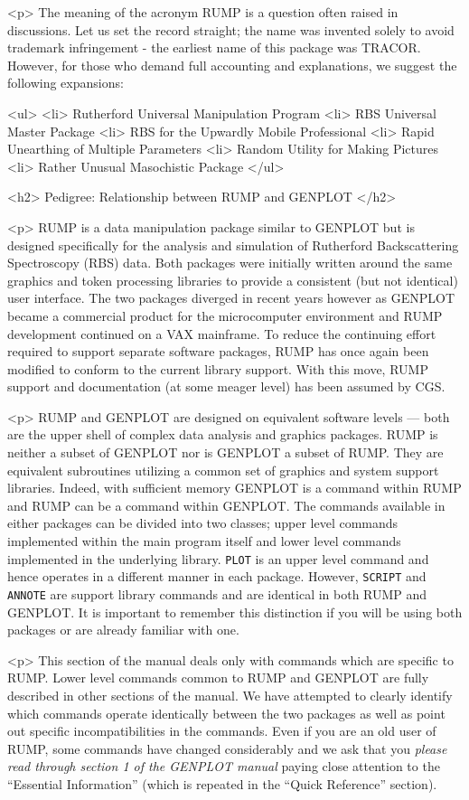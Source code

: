 <p> The meaning of the acronym RUMP is a question often raised in discussions.
Let us set the record straight; the name was invented solely to avoid
trademark infringement - the earliest name of this package was TRACOR.
However, for those who demand full accounting and explanations, we suggest the
following expansions:

<ul>
  <li> Rutherford Universal Manipulation Program
  <li> RBS Universal Master Package
  <li> RBS for the Upwardly Mobile Professional
  <li> Rapid Unearthing of Multiple Parameters
  <li> Random Utility for Making Pictures
  <li> Rather Unusual Masochistic Package
</ul>

<h2> Pedigree:  Relationship between RUMP and GENPLOT </h2>

<p>
RUMP is a data manipulation package similar to GENPLOT but is
designed specifically for the analysis and simulation of Rutherford
Backscattering Spectroscopy (RBS) data.  Both packages were initially
written around the same graphics and token processing libraries to
provide a consistent (but not identical) user interface.  The two
packages diverged in recent years however as GENPLOT became a
commercial product for the microcomputer environment and RUMP
development continued on a VAX mainframe.  To reduce the continuing
effort required to support separate software packages, RUMP has once
again been modified to conform to the current library support.  With
this move, RUMP support and documentation (at some meager level) has
been assumed by CGS.

<p> 
RUMP and GENPLOT are designed on equivalent software levels --- both are
the upper shell of complex data analysis and graphics packages.  RUMP is
neither a subset of GENPLOT nor is GENPLOT a subset of RUMP.  They are
equivalent subroutines utilizing a common set of graphics and system support
libraries.  Indeed, with sufficient memory GENPLOT is a command within RUMP
and RUMP can be a command within GENPLOT.  The commands available in either
packages can be divided into two classes; upper level commands implemented
within the main program itself and lower level commands implemented in the
underlying library.  {\tt PLOT} is an upper level command and hence operates
in a different manner in each package.  However, {\tt SCRIPT} and {\tt
ANNOTE} are support library commands and are identical in both RUMP and
GENPLOT.  It is important to remember this distinction if you will be using
both packages or are already familiar with one.

<p>
This section of the manual deals only with commands which are specific to
RUMP.  Lower level commands common to RUMP and GENPLOT are fully described in
other sections of the manual.  We have attempted to clearly identify which
commands operate identically between the two packages as well as point out
specific incompatibilities in the commands.  Even if you are an old user of
RUMP, some commands have changed considerably and we ask that you {\it please
read through section 1 of the GENPLOT manual} paying close attention to the
``Essential Information'' (which is repeated in the ``Quick Reference''
section).

